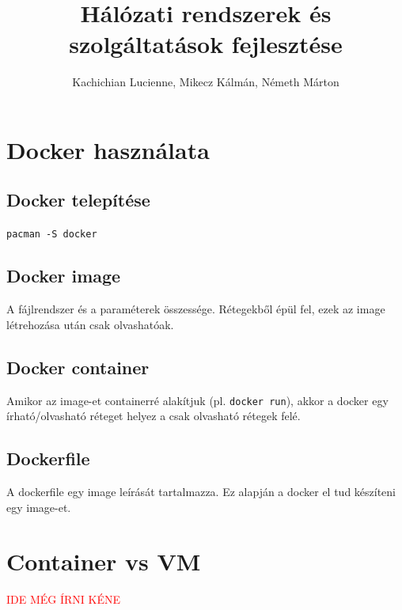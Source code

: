 \documentclass[]{article}
\title{Hálózati rendszerek és szolgáltatások fejlesztése}
\author{Kachichian Lucienne, Mikecz Kálmán, Németh Márton}
\numberwithin{equation}{section}
\begin{document}
\maketitle

\section{Docker használata}

\subsection{Docker telepítése}

\texttt{pacman -S docker}
\subsection{Docker image}

A fájlrendszer és a paraméterek összessége. Rétegekből épül fel, ezek az image létrehozása után csak olvashatóak.

\subsection{Docker container}
Amikor az image-et containerré alakítjuk (pl. \texttt{docker run}), akkor a docker egy írható/olvasható réteget helyez a csak olvasható rétegek felé.

\subsection{Dockerfile}

A dockerfile egy image leírását tartalmazza. Ez alapján a docker el tud készíteni egy image-et.

\section{Container vs VM}

	\textcolor{red}{IDE MÉG ÍRNI KÉNE}
\end{document}
